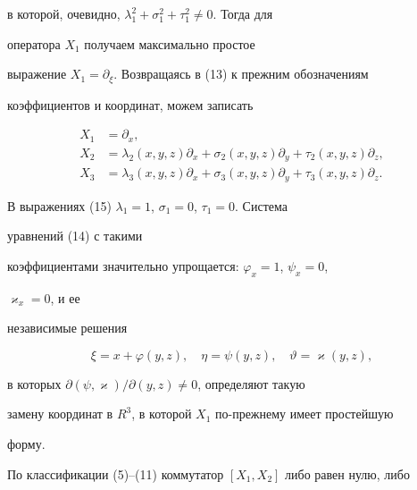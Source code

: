 в которой, очевидно, $\lambda_1^2+\sigma^2_1+\tau^2_1\ne 0$. Тогда для 


оператора $X_1$ получаем максимально простое 


выражение $X_1=\partial_\xi$. Возвращаясь в (13) к прежним обозначениям 


коэффициентов и координат, можем записать


\begin{equation} 


\begin{split} 


X_1&=\partial_x,\\ 


X_2&=\lambda_2(x,y,z)\partial_x+\sigma_2(x,y,z)\partial_y+ 


\tau_2(x,y,z)\partial_z,\\ 


X_3&=\lambda_3(x,y,z)\partial_x+\sigma_3(x,y,z)\partial_y+ 


\tau_3(x,y,z)\partial_z. 


\end{split} 


\end{equation} 


 


В выражениях (15) $\lambda_1=1$, $\sigma_1=0$, $\tau_1=0$. Система 


уравнений (14) с такими 


коэффициентами значительно упрощается: $\varphi_x=1$, $\psi_x=0$, 


$\varkappa_x=0$, и ее 


независимые решения 


\begin{equation} 


\xi=x+\varphi(y,z),\quad \eta=\psi(y,z),\quad 


\vartheta=\varkappa(y,z), 


\end{equation} 


в которых $\partial(\psi,\varkappa)/\partial(y,z)\ne 0$, определяют такую 


замену координат в $R^3$, в которой $X_1$ по-прежнему имеет простейшую 


форму. 


 


По классификации (5)--(11) коммутатор $[X_1,X_2]$ либо равен нулю, либо 


